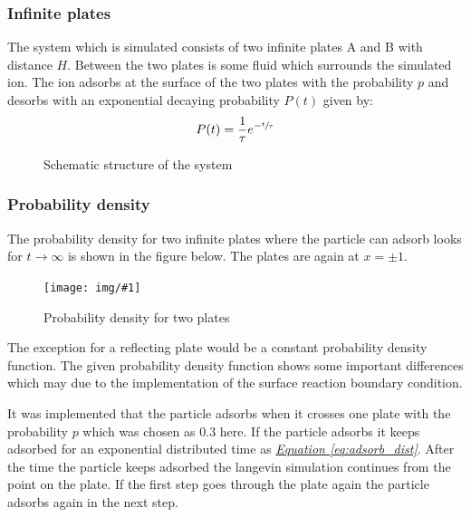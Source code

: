 \documentclass[a4paper, parskip=half]{scrartcl}
\newcommand{\myImage}[2]{
	\begin{figure}[H]
	\centering
	\texttt{[image: img/\#1]}
	\caption{#2}
	\label{pic:#1}
	\end{figure}
}
\newcommand{\myEqRef}[1]{\textit{\hyperref[eq:#1]{Equation \ref*{eq:#1}}}}
\newcommand{\myEqLabel}[1]{\label{eq:#1}}
\begin{document}
\newpage
\subsubsection{Infinite plates}
The system which is simulated consists of two infinite plates A and B with distance $H$. Between the two plates is some fluid which surrounds the simulated ion. The ion adsorbs at the surface of the two plates with the probability $p$ and desorbs with an exponential decaying probability $P(t)$ given by:
\begin{align}
P(t) = \frac{1}{\tau}e^{- \sfrac{t}{\tau}} \myEqLabel{adsorb_dist}
\end{align}
\begin{figure}[H]
\centering
{}
\caption{Schematic structure of the system}
\end{figure}

\subsubsection{Probability density}
The probability density for two infinite plates where the particle can adsorb looks for $t\rightarrow \infty$ is shown in the figure below. The plates are again at $x = \pm 1$.
\myImage{probability_density}{Probability density for two plates}
The exception for a reflecting plate would be a constant probability density function. The given probability density function shows some important differences which may due to the implementation of the surface reaction boundary condition. 

It was implemented that the particle adsorbs when it crosses one plate with the probability $p$ which was chosen as $0.3$ here. 
If the particle adsorbs it keeps adsorbed for an exponential distributed time as \myEqRef{adsorb_dist}. After the time the particle keeps adsorbed the langevin simulation continues from the point on the plate. If the first step goes through the plate again the particle adsorbs again in the next step.
\end{document}
